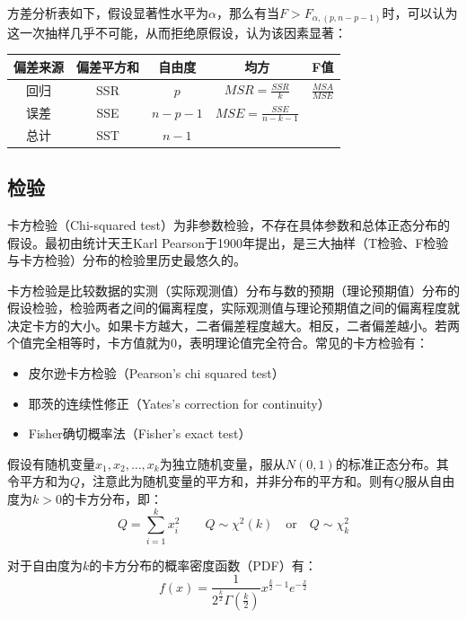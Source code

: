\documentclass[11pt]{article}
\begin{document}
方差分析表如下，假设显著性水平为$\alpha$，那么有当$F > F_{\alpha,(p,n-p-1)}$时，可以认为这一次抽样几乎不可能，从而拒绝原假设，认为该因素显著：
\begin{table}[H]
\centering
\begin{tabular}{@{}ccccc@{}}
\toprule
\textbf{偏差来源} & \textbf{偏差平方和} & \textbf{自由度} & \textbf{均方} & \textbf{F值} \\ \midrule
回归 & SSR & $p$ & $MSR=\frac{SSR}{k}$ & $\frac{MSA}{MSE}$ \\
误差 & SSE & $n-p-1$ & $MSE=\frac{SSE}{n-k-1}$ &                   \\
总计 & SST & $n-1$ &                       &                   \\ \bottomrule
\end{tabular}
\end{table}

\subsection{检验}

卡方检验（Chi-squared test）为非参数检验，不存在具体参数和总体正态分布的假设。最初由统计天王Karl Pearson于1900年提出，是三大抽样（T检验、F检验与卡方检验）分布的检验里历史最悠久的。

卡方检验是比较数据的实测（实际观测值）分布与数的预期（理论预期值）分布的假设检验，检验两者之间的偏离程度，实际观测值与理论预期值之间的偏离程度就决定卡方的大小。如果卡方越大，二者偏差程度越大。相反，二者偏差越小。若两个值完全相等时，卡方值就为0，表明理论值完全符合。常见的卡方检验有：
\begin{itemize}
    \item 皮尔逊卡方检验（Pearson's chi squared test）
    \item 耶茨的连续性修正（Yates's correction for continuity）
    \item Fisher确切概率法（Fisher's exact test）
\end{itemize}

假设有随机变量$x_1,x_2,\dots,x_k$为独立随机变量，服从$N(0,1)$的标准正态分布。其令平方和为$Q$，注意此为随机变量的平方和，并非分布的平方和。则有$Q$服从自由度为$k>0$的卡方分布，即：
\begin{equation*}
    Q = \sum_{i=1}^{k} x_i^2 \qquad Q \sim \chi^2(k) \quad\text{or}\quad Q \sim \chi_k^2
\end{equation*}

对于自由度为$k$的卡方分布的概率密度函数（PDF）有：
\begin{equation*}
    f(x) = \frac{1}{2^{\frac{k}{2}}\Gamma\left(\frac{k}{2}\right)} x^{\frac{k}{2}-1} e^{-\frac{x}{2}}
\end{equation*}
\end{document}
